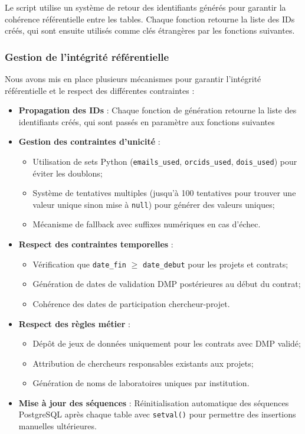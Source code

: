 \documentclass[12pt,a4paper]{article}
\begin{document}
Le script utilise un système de retour des identifiants générés pour garantir la cohérence référentielle entre les tables. Chaque fonction retourne la liste des IDs créés, qui sont ensuite utilisés comme clés étrangères par les fonctions suivantes.

\subsubsection{Gestion de l'intégrité référentielle}
Nous avons mis en place plusieurs mécanismes pour garantir l'intégrité référentielle et le respect des différentes contraintes :

\begin{itemize}
    \item \textbf{Propagation des IDs} : Chaque fonction de génération retourne la liste des identifiants créés, qui sont passés en paramètre aux fonctions suivantes
    
    \item \textbf{Gestion des contraintes d'unicité} :
    \begin{itemize}
        \item Utilisation de sets Python (\texttt{emails\_used}, \texttt{orcids\_used}, \texttt{dois\_used}) pour éviter les doublons;
        \item Système de tentatives multiples (jusqu'à 100 tentatives pour trouver une valeur unique sinon mise à \texttt{null}) pour générer des valeurs uniques;
        \item Mécanisme de fallback avec suffixes numériques en cas d'échec.
    \end{itemize}
    
    \item \textbf{Respect des contraintes temporelles} :
    \begin{itemize}
        \item Vérification que \texttt{date\_fin} $\geq$ \texttt{date\_debut} pour les projets et contrats;
        \item Génération de dates de validation DMP postérieures au début du contrat;
        \item Cohérence des dates de participation chercheur-projet.
    \end{itemize}
    
    \item \textbf{Respect des règles métier} :
    \begin{itemize}
        \item Dépôt de jeux de données uniquement pour les contrats avec DMP validé;
        \item Attribution de chercheurs responsables existants aux projets;
        \item Génération de noms de laboratoires uniques par institution.
    \end{itemize}
    
    \item \textbf{Mise à jour des séquences} : Réinitialisation automatique des séquences PostgreSQL après chaque table avec \texttt{setval()} pour permettre des insertions manuelles ultérieures.
\end{itemize}
\end{document}
